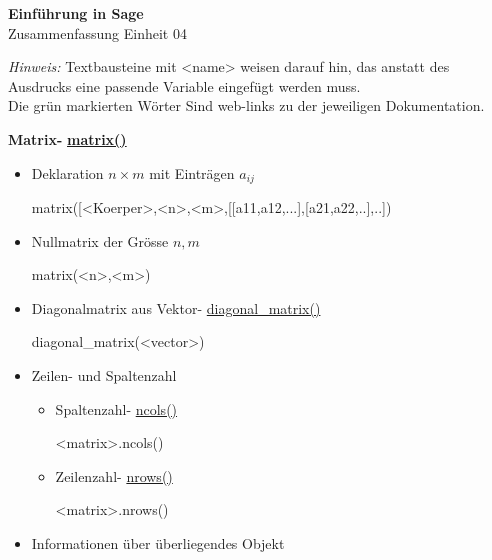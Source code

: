 \documentclass[a4paper,9pt,DIV15,twocolumn]{scrartcl}
\begin{document}
\begin{center}
    \textbf{\LARGE Einführung in Sage}\\
    {\large Zusammenfassung Einheit 04}
\end{center}
\textsl{Hinweis:} Textbausteine mit <name> weisen darauf hin, das anstatt des Ausdrucks eine passende Variable eingefügt werden muss.\\
Die {\color{Green}grün} markierten Wörter Sind web-links zu der jeweiligen Dokumentation.

\medskip
\textbf{Matrix- } \href{https://sage.math.uni-goettingen.de/doc/static/reference/sage/matrix/constructor.html#sage.matrix.constructor.Matrix}{\textbf{matrix()}}
\begin{itemize}
	\item Deklaration $n\times m$ mit Eintr\"agen $a_{ij}$
\begin{sagein}
matrix([<Koerper>,<n>,<m>,[[a11,a12,...],[a21,a22,..],..])
\end{sagein}
\item Nullmatrix der Gr\"osse $n,m$
	\begin{sagein}
matrix(<n>,<m>)
	\end{sagein}
\item Diagonalmatrix aus Vektor- \href{https://sage.math.uni-goettingen.de/doc/static/reference/sage/matrix/constructor.html#sage.matrix.constructor.diagonal_matrix}{diagonal\_matrix()}
\begin{sagein}
diagonal_matrix(<vector>)
\end{sagein}
\item Zeilen- und Spaltenzahl
\begin{itemize}
 \item Spaltenzahl- \href{https://sage.math.uni-goettingen.de/doc/static/reference/sage/matrix/matrix0.html?highlight=matrix.rank#sage.matrix.matrix0.Matrix.ncols}{ncols()}
\begin{sagein}
<matrix>.ncols()
\end{sagein}
\item Zeilenzahl- \href{https://sage.math.uni-goettingen.de/doc/static/reference/sage/matrix/matrix0.html?highlight=matrix.rank#sage.matrix.matrix0.Matrix.nrows}{nrows()}
\begin{sagein}
<matrix>.nrows()
\end{sagein}
\end{itemize}
\item Informationen über überliegendes Objekt
\begin{sagein}

\end{sagein}
\end{itemize}
\end{document}
